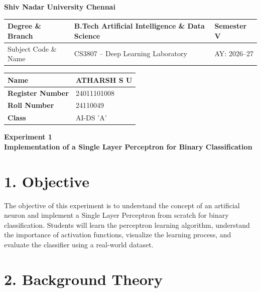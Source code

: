 \documentclass[11pt]{article}
\begin{document}
\begin{center}
\Large\textbf{Shiv Nadar University Chennai}\\[2mm]
\end{center}

\renewcommand{\arraystretch}{1.4}

\begin{tabular}{|p{3.5cm}|p{8cm}|p{2cm}|}
\hline
Degree \& Branch & B.Tech Artificial Intelligence \& Data Science & Semester V\\ \hline
Subject Code \& Name & CS3807 -- Deep Learning Laboratory & AY: 2026--27\\ \hline
\end{tabular}

\begin{tabular}{|p{3.5cm}|p{8cm}|}
\hline
\textbf{Name} & {ATHARSH S U}\\ \hline
\textbf{Register Number} &{24011101008} \\ \hline
\textbf{Roll Number} &{24110049} \\ \hline
\textbf{Class} & {AI-DS 'A'}\\ \hline
\end{tabular}
\vspace{3mm}

\begin{center}
\Large\textbf{Experiment 1}\\
\large\textbf{Implementation of a Single Layer Perceptron for Binary Classification}
\end{center}


\section*{1. Objective}

The objective of this experiment is to understand the concept of an artificial neuron and implement a Single Layer Perceptron from scratch for binary classification. Students will learn the perceptron learning algorithm, understand the importance of activation functions, visualize the learning process, and evaluate the classifier using a real-world dataset.


\section*{2. Background Theory}
\end{document}

